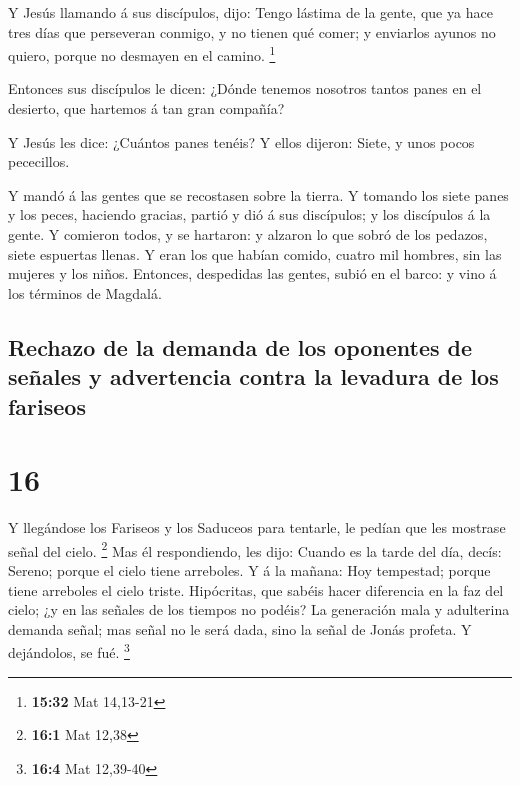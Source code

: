  Y Jesús llamando á sus discípulos, dijo: Tengo lástima
de la gente, que ya hace tres días que perseveran conmigo, y no tienen
qué comer; y enviarlos ayunos no quiero, porque no desmayen en el
camino. \footnote{\textbf{15:32} Mat 14,13-21}

 Entonces sus discípulos le dicen: ¿Dónde tenemos
nosotros tantos panes en el desierto, que hartemos á tan gran compañía?

 Y Jesús les dice: ¿Cuántos panes tenéis? Y ellos
dijeron: Siete, y unos pocos pececillos.

 Y mandó á las gentes que se recostasen sobre la tierra.
 Y tomando los siete panes y los peces, haciendo gracias,
partió y dió á sus discípulos; y los discípulos á la gente.
 Y comieron todos, y se hartaron: y alzaron lo que sobró
de los pedazos, siete espuertas llenas.  Y eran los que
habían comido, cuatro mil hombres, sin las mujeres y los niños.
 Entonces, despedidas las gentes, subió en el barco: y
vino á los términos de Magdalá.

\hypertarget{rechazo-de-la-demanda-de-los-oponentes-de-seuxf1ales-y-advertencia-contra-la-levadura-de-los-fariseos}{%
\subsection{Rechazo de la demanda de los oponentes de señales y
advertencia contra la levadura de los
fariseos}\label{rechazo-de-la-demanda-de-los-oponentes-de-seuxf1ales-y-advertencia-contra-la-levadura-de-los-fariseos}}

\hypertarget{section-15}{%
\section{16}\label{section-15}}

 Y llegándose los Fariseos y los Saduceos para tentarle,
le pedían que les mostrase señal del cielo. \footnote{\textbf{16:1} Mat
  12,38}  Mas él respondiendo, les dijo: Cuando es la
tarde del día, decís: Sereno; porque el cielo tiene arreboles.
 Y á la mañana: Hoy tempestad; porque tiene arreboles el
cielo triste. Hipócritas, que sabéis hacer diferencia en la faz del
cielo; ¿y en las señales de los tiempos no podéis?  La
generación mala y adulterina demanda señal; mas señal no le será dada,
sino la señal de Jonás profeta. Y dejándolos, se fué. \footnote{\textbf{16:4}
  Mat 12,39-40}

